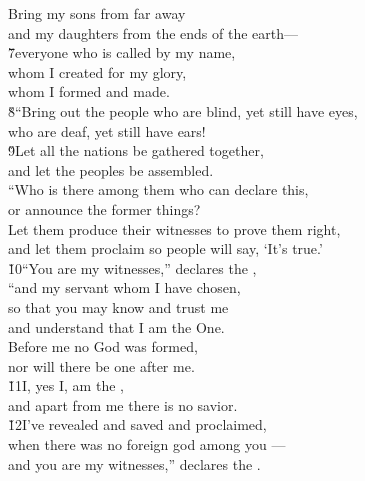 \begin{poetry}
\poeml Bring my sons from far away \\
\poemll    and my daughters from the ends of the earth--- \\
\poeml \v{7}everyone who is called by my name, \\
\poemll    whom I created for my glory, \\
\poemlll       whom I formed and made. \\
\poeml \v{8}``Bring out the people who are blind, yet still have eyes, \\
\poemll    who are deaf, yet still have ears! \\
\poeml \v{9}Let all the nations be gathered together, \\
\poemll    and let the peoples be assembled. \\
\poeml ``Who is there among them who can declare this, \\
\poemll    or announce the former things? \\
\poeml Let them produce their witnesses to prove them right, \\
\poemll    and let them proclaim so people will say, `It's true.' \\
\poeml \v{10}``You are my witnesses,'' declares the , \\
\poemll    ``and my servant whom I have chosen, \\
\poeml so that you may know and trust me \\
\poemll    and understand that I am the One. \\
\poeml Before me no God was formed, \\
\poemll    nor will there be one after me. \\
\poeml \v{11}I, yes I, am the , \\
\poemll    and apart from me there is no savior. \\
\poeml \v{12}I've revealed and saved and proclaimed, \\
\poemll    when there was no foreign god among you --- \\
\poemlll       and you are my witnesses,'' declares the . \\

\end{poetry}
